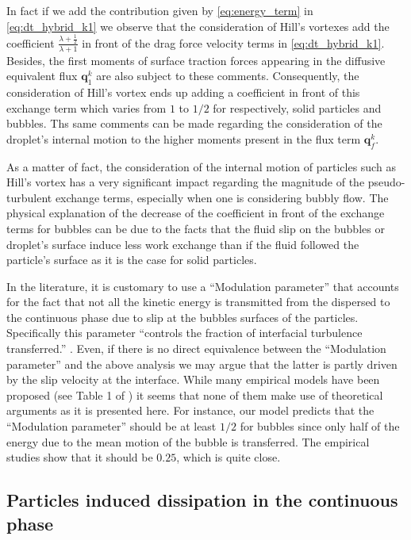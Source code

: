 In fact if we add the contribution given by \ref{eq:energy_term} in \ref{eq:dt_hybrid_k1} we observe that the consideration of Hill's vortexes add the coefficient $\frac{\lambda +\frac{1}{2}}{\lambda+1}$ in front of the drag force velocity terms in \ref{eq:dt_hybrid_k1}.
Besides, the first moments of surface traction forces appearing in the diffusive equivalent flux $\textbf{q}_1^k$ are also subject to these comments. 
Consequently, the consideration of Hill's vortex ends up adding a coefficient in front of this exchange term which varies from $1$ to $1/2$ for respectively, solid particles and bubbles. 
Ths same comments can be made regarding the consideration of the droplet's internal motion to the higher moments present in the flux term $\textbf{q}^k_f$. 

As a matter of fact, the consideration of the internal motion of particles such as Hill's vortex has a very significant impact regarding the magnitude of the pseudo-turbulent exchange terms, especially when one is considering bubbly flow. 
The physical explanation of the decrease of the coefficient in front of the exchange terms for bubbles can be due to the facts that the fluid slip on the bubbles or droplet's surface induce less work exchange than if the fluid followed the particle's surface as it is the case for solid particles. 

In the literature, it is customary to use a ``Modulation parameter'' that accounts for the fact that not all the kinetic energy is transmitted from the dispersed to the continuous phase due to slip at the bubbles surfaces of the particles.
Specifically this parameter ``controls the fraction of interfacial turbulence transferred.'' \citep{magolan2019quantitative}. 
Even, if there is no direct equivalence between the ``Modulation parameter'' and the above analysis we may argue that the latter is partly driven by the slip velocity at the interface. 
While many empirical models have been proposed (see Table 1 of \citet{magolan2019quantitative}) it seems that none of them make use of theoretical arguments as it is presented here.
For instance, our model predicts that the ``Modulation parameter'' should be at least $1/2$ for bubbles since only half of the energy due to the mean motion of the bubble is transferred. 
The empirical studies show that it should be $0.25$, which is quite close.


\subsection{Particles induced dissipation in the continuous phase}

